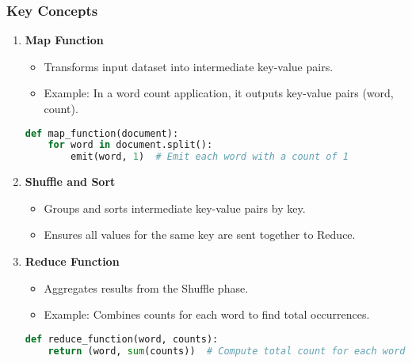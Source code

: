 \documentclass[aspectratio=169]{beamer}
\begin{document}
\begin{frame}[fragile]
    \frametitle{Key Concepts}
    \begin{enumerate}
        \item \textbf{Map Function}
        \begin{itemize}
            \item Transforms input dataset into intermediate key-value pairs.
            \item Example: In a word count application, it outputs key-value pairs (word, count).
        \end{itemize}
        
        \begin{lstlisting}[language=Python]
def map_function(document):
    for word in document.split():
        emit(word, 1)  # Emit each word with a count of 1
        \end{lstlisting}
        
        \item \textbf{Shuffle and Sort}
        \begin{itemize}
            \item Groups and sorts intermediate key-value pairs by key.
            \item Ensures all values for the same key are sent together to Reduce.
        \end{itemize}
        
        \item \textbf{Reduce Function}
        \begin{itemize}
            \item Aggregates results from the Shuffle phase.
            \item Example: Combines counts for each word to find total occurrences.
        \end{itemize}

        \begin{lstlisting}[language=Python]
def reduce_function(word, counts):
    return (word, sum(counts))  # Compute total count for each word
        \end{lstlisting}
    \end{enumerate}
\end{frame}
\end{document}
